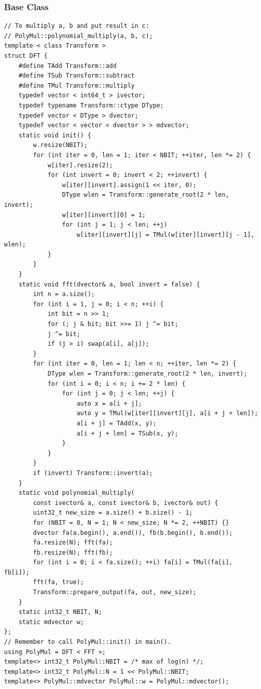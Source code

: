 \documentclass[10pt,letterpaper,landscape]{article}
\begin{document}
\begin{multicols}{2}
\subsubsection{Base Class}
\begin{lstlisting}
// To multiply a, b and put result in c:
// PolyMul::polynomial_multiply(a, b, c);
template < class Transform >
struct DFT {
    #define TAdd Transform::add
    #define TSub Transform::subtract
    #define TMul Transform::multiply
    typedef vector < int64_t > ivector;
    typedef typename Transform::ctype DType;
    typedef vector < DType > dvector;
    typedef vector < vector < dvector > > mdvector;
    static void init() {
        w.resize(NBIT);
        for (int iter = 0, len = 1; iter < NBIT; ++iter, len *= 2) {
            w[iter].resize(2);
            for (int invert = 0; invert < 2; ++invert) {
                w[iter][invert].assign(1 << iter, 0);
                DType wlen = Transform::generate_root(2 * len, invert);
                w[iter][invert][0] = 1;
                for (int j = 1; j < len; ++j)
                    w[iter][invert][j] = TMul(w[iter][invert][j - 1], wlen);
            }
        }
    }
    static void fft(dvector& a, bool invert = false) {
        int n = a.size();
        for (int i = 1, j = 0; i < n; ++i) {
            int bit = n >> 1; 
            for (; j & bit; bit >>= 1) j ^= bit;
            j ^= bit;
            if (j > i) swap(a[i], a[j]);
        }
        for (int iter = 0, len = 1; len < n; ++iter, len *= 2) {
            DType wlen = Transform::generate_root(2 * len, invert);
            for (int i = 0; i < n; i += 2 * len) {
                for (int j = 0; j < len; ++j) {
                    auto x = a[i + j];
                    auto y = TMul(w[iter][invert][j], a[i + j + len]);
                    a[i + j] = TAdd(x, y);
                    a[i + j + len] = TSub(x, y);
                }
            }
        }
        if (invert) Transform::invert(a);
    }
    static void polynomial_multiply(
        const ivector& a, const ivector& b, ivector& out) {
        uint32_t new_size = a.size() + b.size() - 1;
        for (NBIT = 0, N = 1; N < new_size; N *= 2, ++NBIT) {}
        dvector fa(a.begin(), a.end()), fb(b.begin(), b.end());
        fa.resize(N); fft(fa);
        fb.resize(N); fft(fb);
        for (int i = 0; i < fa.size(); ++i) fa[i] = TMul(fa[i], fb[i]);
        fft(fa, true);
        Transform::prepare_output(fa, out, new_size);
    }
    static int32_t NBIT, N;
    static mdvector w;
};
// Remember to call PolyMul::init() in main().
using PolyMul = DFT < FFT >;
template<> int32_t PolyMul::NBIT = /* max of log(n) */;
template<> int32_t PolyMul::N = 1 << PolyMul::NBIT;
template<> PolyMul::mdvector PolyMul::w = PolyMul::mdvector();
\end{lstlisting}

\end{multicols}
\end{document}
